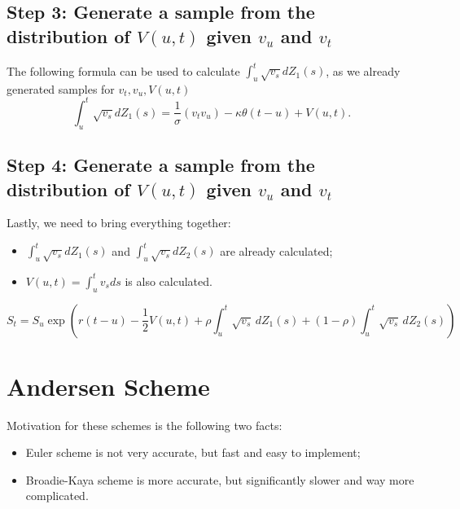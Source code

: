     \subsection*{Step 3: Generate a sample from the distribution of $V(u, t)$ given $v_u$ and $v_t$}
        The following formula can be used to calculate $\int_{u}^t \sqrt{v_s} dZ_1(s)$, as we already generated samples for $v_t , v_u, V(u, t)$
        \begin{equation}
            \int_{u}^t \sqrt{v_s} dZ_1(s) = \frac{1}{\sigma}(v_t v_u) - \kappa\theta(t-u) + V(u, t).
        \end{equation}


    \subsection*{Step 4: Generate a sample from the distribution of $V(u, t)$ given $v_u$ and $v_t$}
        Lastly, we need to bring everything together:
        \begin{itemize}
            \item $\int_{u}^t \sqrt{v_s} dZ_1(s)$ and $\int_{u}^t \sqrt{v_s} dZ_2(s)$ are already calculated;
            \item $V(u, t) = \int_{u}^t v_s ds $ is also calculated.
        \end{itemize}
        \begin{equation}
            S_t = S_u \exp{\left( r(t-u)-\frac{1}{2} V(u, t)  + \rho\int_{u}^{t} \sqrt{v_s} \, dZ_1(s) + (1-\rho)\int_{u}^{t} \sqrt{v_s} \, dZ_2(s)  \right)}
        \end{equation}

    \section{Andersen Scheme}
        Motivation for these schemes is the following two facts:
        \begin{itemize}
            \item Euler scheme is not very accurate, but fast and easy to implement;
            \item Broadie-Kaya scheme is more accurate, but significantly slower and way more complicated.
        \end{itemize}
